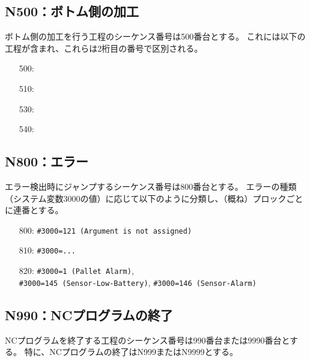 \clearpage
\subsection{N500：ボトム側の加工}
ボトム側の加工を行う工程のシーケンス番号は500番台とする。
これには以下の工程が含まれ、これらは2桁目の番号で区別される。
\begin{enumerate}
\item[500:] \BottomEndFacecutMilling
\item[510:] \BottomOutcutMilling
\item[530:] \BottomEndFaceOutCChamferMilling
\item[540:] \BottomEndFaceInCChamferMilling
\end{enumerate}


\subsection{N800：エラー\label{subsec:sequenceNerror}\vphantom{\ref{subsec:sequenceNerror}}\TBW}
エラー検出時にジャンプするシーケンス番号は800番台とする。
エラーの種類（システム変数\ttNum3000の値）に応じて以下のように分類し、（概ね）プロックごとに連番とする。
\begin{enumerate}
\item[800:] \verb|#3000=121 (Argument is not assigned)|
\item[810:] \verb|#3000=...|
\item[820:] \verb|#3000=1 (Pallet Alarm)|,\\
            \verb|#3000=145 (Sensor-Low-Battery)|, \verb|#3000=146 (Sensor-Alarm)|
\end{enumerate}


\subsection{N990：NCプログラムの終了\label{subsec:sequenceNprgEnd}}
NCプログラムを終了する工程のシーケンス番号は990番台または9990番台とする。
特に、NCプログラムの終了はN999またはN9999とする。



